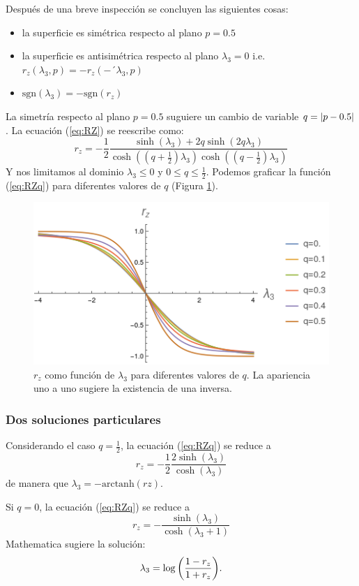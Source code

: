 Después de una breve inspección se concluyen las siguientes cosas:
\begin{itemize}
\item la superficie es simétrica respecto al plano $p=0.5$
\item la superficie es antisimétrica  respecto al plano $\lambda_{3}=0$ i.e. $r_{z
}(\lambda_{3},p)=-r_{z
}(-´\lambda_{3},p)$
\item $\text{sgn}(\lambda_{3})=-\text{sgn}(r_{z})$
\end{itemize}

La simetría respecto al plano $p=0.5$ suguiere un cambio de variable $q=\abs{p-0.5}$. La ecuación (\ref{eq:RZ}) se reescribe como:
\begin{equation}\label{eq:RZq}
r_{z}=-\frac{1}{2}\frac{\sinh(\lambda_{3})+2q\sinh(2q\lambda_{3})}{\cosh((q+\frac{1}{2})\lambda_{3})\cosh((q-\frac{1}{2})\lambda_{3})}
\end{equation}
Y nos limitamos al dominio $\lambda_{3}\leq0$ y $0\leq q\leq\frac{1}{2}$. Podemos graficar la función (\ref{eq:RZq}) para diferentes valores de $q$ (Figura \ref{fig:rzinv}).
\begin{figure}[h!]
\centering
\includegraphics[width=0.6\linewidth]{maxent/figures/rz_has_inverse_lambda-4to4.png}
\caption{$r_{z}$ como función de $\lambda_{3}$ para diferentes valores de $q$. La apariencia uno a uno sugiere la existencia de una inversa.}
\label{fig:rzinv}
\end{figure}

\subsubsection{Dos soluciones particulares}

Considerando el caso $q=\frac{1}{2}$, la ecuación (\ref{eq:RZq}) se reduce a 
\begin{equation}
r_z=-\frac{1}{2}\frac{2\sinh(\lambda_{3})}{\cosh(\lambda_{3})}
\end{equation}
de manera que $\lambda_{3}=-\text{arctanh}(rz)$.

Si $q=0$, la ecuación (\ref{eq:RZq}) se reduce a
\begin{equation}
r_z=-\frac{\sinh(\lambda_{3})}{\cosh(\lambda_{3}+1)}
\end{equation}
Mathematica sugiere la solución:
\begin{equation}\label{eq:lambda0.5}
\lambda_{3}=\log\qty(\frac{1-r_{z}}{1+r_{z}}).
\end{equation}
\newpage